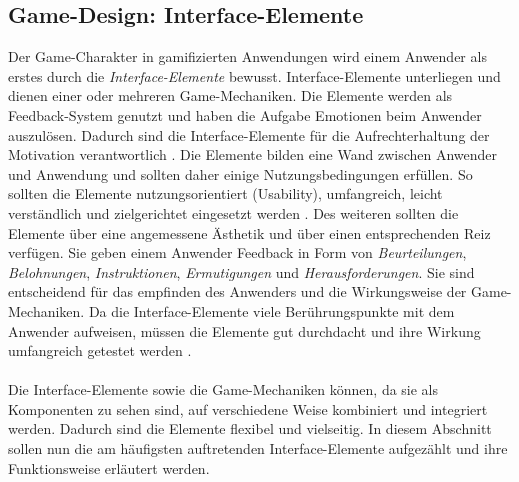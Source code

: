 \documentclass[a4paper,12pt]{scrartcl}
\begin{document}
\subsection{Game-Design: Interface-Elemente}
Der Game-Charakter in gamifizierten Anwendungen wird einem Anwender als erstes durch die \textit{Interface-Elemente} bewusst. Interface-Elemente unterliegen und dienen einer oder mehreren Game-Mechaniken. Die Elemente werden als Feedback-System genutzt und haben die Aufgabe Emotionen beim Anwender auszulösen. Dadurch sind die Interface-Elemente für die Aufrechterhaltung der Motivation verantwortlich \cite{Mcgonigal2011}. Die Elemente bilden eine Wand zwischen Anwender und Anwendung \cite{Schell2014} und sollten daher einige Nutzungsbedingungen erfüllen. So sollten die Elemente nutzungsorientiert (Usability), umfangreich, leicht verständlich und zielgerichtet eingesetzt werden \cite{Schell2014}. Des weiteren sollten die Elemente über eine angemessene Ästhetik und über einen entsprechenden Reiz verfügen. Sie geben einem Anwender Feedback in Form von \textit{Beurteilungen}, \textit{Belohnungen}, \textit{Instruktionen}, \textit{Ermutigungen} und \textit{Herausforderungen}. Sie sind entscheidend für das empfinden des Anwenders und die Wirkungsweise der Game-Mechaniken. Da die Interface-Elemente viele Berührungspunkte mit dem Anwender aufweisen, müssen die Elemente gut durchdacht und ihre Wirkung umfangreich getestet werden \cite{Schell2014}.
\\\\
Die Interface-Elemente sowie die Game-Mechaniken können, da sie als Komponenten zu sehen sind, auf verschiedene Weise kombiniert und integriert werden. Dadurch sind die Elemente flexibel und vielseitig. In diesem Abschnitt sollen nun die am häufigsten auftretenden Interface-Elemente aufgezählt und ihre Funktionsweise erläutert werden. 
\end{document}
